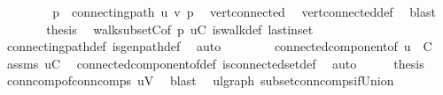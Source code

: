\begin{isabellebody}
\ \ \isamarkupfalse%
{\isacharminus}{\kern0pt}\isanewline
\ \ \ \ \isamarkupfalse%
\ p\ \ {\isachardoublequoteopen}connecting{\isacharunderscore}{\kern0pt}path\ u\ v\ p{\isachardoublequoteclose}\ \isamarkupfalse%
\ vert{\isacharunderscore}{\kern0pt}connected\ \isamarkupfalse%
\ vert{\isacharunderscore}{\kern0pt}connected{\isacharunderscore}{\kern0pt}def\ \isamarkupfalse%
\ blast\isanewline
\ \ \ \ \isamarkupfalse%
\ \isamarkupfalse%
\ {\isacharquery}{\kern0pt}thesis\ \isamarkupfalse%
\ walk{\isacharunderscore}{\kern0pt}subset{\isacharunderscore}{\kern0pt}C{\isacharbrackleft}{\kern0pt}of\ p{\isacharbrackright}{\kern0pt}\ {\isacartoucheopen}u{\isasymin}C{\isacartoucheclose}\ is{\isacharunderscore}{\kern0pt}walk{\isacharunderscore}{\kern0pt}def\ last{\isacharunderscore}{\kern0pt}in{\isacharunderscore}{\kern0pt}set\ \isamarkupfalse%
\ connecting{\isacharunderscore}{\kern0pt}path{\isacharunderscore}{\kern0pt}def\ is{\isacharunderscore}{\kern0pt}gen{\isacharunderscore}{\kern0pt}path{\isacharunderscore}{\kern0pt}def\ \isamarkupfalse%
\ auto\isanewline
\ \ \isamarkupfalse%
\isanewline
\ \ \isamarkupfalse%
\ \isamarkupfalse%
\ {\isachardoublequoteopen}connected{\isacharunderscore}{\kern0pt}component{\isacharunderscore}{\kern0pt}of\ u\ {\isacharequal}{\kern0pt}\ C{\isachardoublequoteclose}\ \isamarkupfalse%
\ assms\ {\isacartoucheopen}u{\isasymin}C{\isacartoucheclose}\ \isamarkupfalse%
\ connected{\isacharunderscore}{\kern0pt}component{\isacharunderscore}{\kern0pt}of{\isacharunderscore}{\kern0pt}def\ is{\isacharunderscore}{\kern0pt}connected{\isacharunderscore}{\kern0pt}set{\isacharunderscore}{\kern0pt}def\ \isamarkupfalse%
\ auto\isanewline
\ \ \isamarkupfalse%
\ \isamarkupfalse%
\ {\isacharquery}{\kern0pt}thesis\ \isamarkupfalse%
\ conn{\isacharunderscore}{\kern0pt}comp{\isacharunderscore}{\kern0pt}of{\isacharunderscore}{\kern0pt}conn{\isacharunderscore}{\kern0pt}comps\ {\isacartoucheopen}u{\isasymin}V{\isacartoucheclose}\ \isamarkupfalse%
\ blast\isanewline
{}\isamarkupfalse%
%
\endisatagproof
{\isafoldproof}%
%
\isadelimproof
\isanewline
%
\endisadelimproof
\isanewline
{}\isamarkupfalse%
\ {\isacharparenleft}{\kern0pt}\ ulgraph{\isacharparenright}{\kern0pt}\ subset{\isacharunderscore}{\kern0pt}conn{\isacharunderscore}{\kern0pt}comps{\isacharunderscore}{\kern0pt}if{\isacharunderscore}{\kern0pt}Union{\isacharcolon}{\kern0pt}\isanewline

\end{isabellebody}

